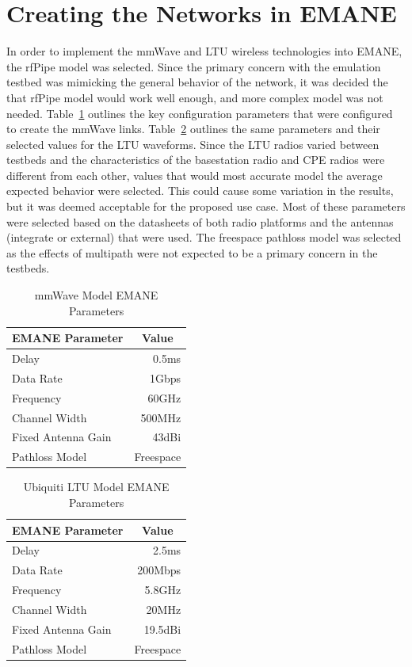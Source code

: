 \section{Creating the Networks in EMANE}
In order to implement the mmWave and LTU wireless technologies into EMANE, the rfPipe model was selected.
Since the primary concern with the emulation testbed was mimicking the general behavior of the network, it was decided the that rfPipe model would work well enough, and more complex model was not needed.
Table~\ref{mmwave_params} outlines the key configuration parameters that were configured to create the mmWave links.
Table~\ref{ltu_params} outlines the same parameters and their selected values for the LTU waveforms.
Since the LTU radios varied between testbeds and the characteristics of the basestation radio and CPE radios were different from each other, values that would most accurate model the average expected behavior were selected.
This could cause some variation in the results, but it was deemed acceptable for the proposed use case.
Most of these parameters were selected based on the datasheets of both radio platforms and the antennas (integrate or external) that were used.
The freespace pathloss model was selected as the effects of multipath were not expected to be a primary concern in the testbeds.\par
\begin{table}
\centering
\caption{mmWave Model EMANE Parameters}
\begin{tabular}{lr} 
\hline
\multicolumn{1}{c}{EMANE Parameter} & \multicolumn{1}{c}{Value} \\ 
\hline
Delay & 0.5ms \\
Data Rate & 1Gbps \\
Frequency & 60GHz \\
Channel Width & 500MHz \\
Fixed Antenna Gain & 43dBi \\
Pathloss Model & \multicolumn{1}{l}{Freespace} \\
\hline
\end{tabular}
\label{mmwave_params}
\end{table}
\begin{table}
\centering
\caption{Ubiquiti LTU Model EMANE Parameters}
\begin{tabular}{lr} 
\hline
\multicolumn{1}{c}{EMANE Parameter} & \multicolumn{1}{c}{Value} \\ 
\hline
Delay & 2.5ms \\
Data Rate & 200Mbps \\
Frequency & 5.8GHz \\
Channel Width & 20MHz \\
Fixed Antenna Gain & 19.5dBi \\
Pathloss Model & \multicolumn{1}{l}{Freespace} \\
\hline
\end{tabular}
\label{ltu_params}
\end{table}

